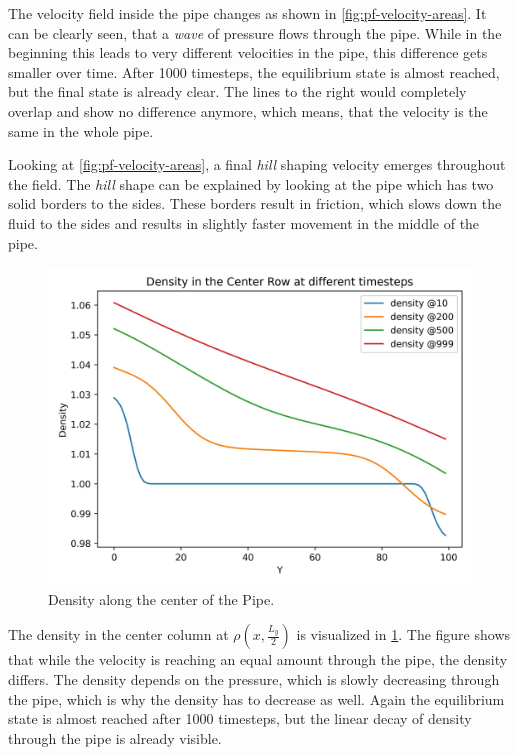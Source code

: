 The velocity field inside the pipe changes as shown in \cref{fig:pf-velocity-areas}.
It can be clearly seen, that a \textit{wave} of pressure flows through the pipe.
While in the beginning this leads to very different velocities in the pipe, this difference gets smaller over time.
After 1000 timesteps, the equilibrium state is almost reached, but the final state is already clear.
The lines to the right would completely overlap and show no difference anymore, which means, that the velocity is the same in the whole pipe.
\newline

Looking at \cref{fig:pf-velocity-areas}, a final \textit{hill} shaping velocity emerges throughout the field.
The \textit{hill} shape can be explained by looking at the pipe which has two solid borders to the sides.
These borders result in friction, which slows down the fluid to the sides and results in slightly faster movement in the middle of the pipe.

\begin{figure}[H]
    \begin{center}
        \includegraphics[width=0.5\linewidth]{graphs/PoiseuilleFlow/density_at_column_x}
        \caption{Density along the center of the Pipe.}
        \label{fig:pf-density}
    \end{center}
\end{figure}

The density in the center column at $\rho\left( x, \frac{L_y}{2} \right)$ is visualized in \cref{fig:pf-density}.
The figure shows that while the velocity is reaching an equal amount through the pipe, the density differs.
The density depends on the pressure, which is slowly decreasing through the pipe, which is why the density has to decrease as well.
Again the equilibrium state is almost reached after 1000 timesteps, but the linear decay of density through the pipe is already visible.


